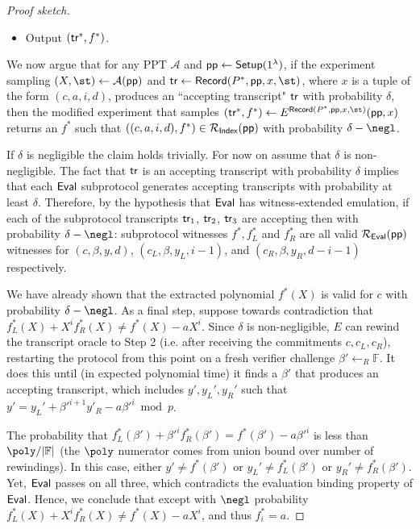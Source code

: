 \begin{proof}[Proof sketch]
\begin{itemize}
\item Output $(\textsf{{tr}}^*, f^*)$.  
\end{itemize}

We now argue that for any PPT $\mathcal{A}$ and $\textsf{pp} \leftarrow \textsf{{Setup}}(1^\lambda)$, if the experiment sampling $(X, \st) \leftarrow \mathcal{A}(\params)$ and $\tr \leftarrow \pro{Record}(P^*, \params, x, \st)$, where $x$ is a tuple of the form $(c, a, i, d)$, produces an ``accepting transcript" $\textsf{{tr}}$ with probability $\delta$, then the modified experiment that samples $(\tr^*, f^*) \leftarrow E^{\textsf{Record}(P^*, \params, x, \st)}(\params, x)$ returns an $f^*$ such that $((c, a, i, d), f^*) \in \mathcal{R_\textsf{Index}}(\textsf{pp})$ with probability $\delta - \negl$. 

If $\delta$ is negligible the claim holds trivially. For now on assume that $\delta$ is non-negligible. 
The fact that $\textsf{{tr}}$ is an accepting transcript with probability $\delta$ implies that each $\textsf{{Eval}}$ subprotocol generates accepting transcripts with probability at least $\delta$. Therefore, by the hypothesis that $\textsf{{Eval}}$ has witness-extended emulation, if each of the subprotocol transcripts $\textsf{{tr}}_1$, $\textsf{{tr}}_2$, $\textsf{{tr}}_3$ are accepting then with probability $\delta - \negl$: subprotocol witnesses $f^*, f_L^*$ and $f_R^*$ are all valid $\mathcal{R_\textsf{Eval}}(\textsf{pp})$ witnesses for $(c, \beta, y, d)$, $(c_L, \beta, y_L, i-1)$, and $(c_R, \beta, y_R, d - i - 1)$ respectively. 

We have already shown that the extracted polynomial $f^*(X)$ is valid for $c$ with probability $\delta - \negl$. As a final step, suppose towards contradiction that $f_L^*(X) + X^i f_R^*(X) \neq f^*(X) - a X^i$. Since $\delta$ is non-negligible, $E$ can rewind the transcript oracle to Step 2 (i.e. after receiving the commitments $c, c_L, c_R$), restarting the protocol from this point on a fresh verifier challenge $\beta' \leftarrow_R \mathbb{F}$. It does this until (in expected polynomial time) it finds a $\beta'$ that produces an accepting transcript, which includes $y', y_L', y_R'$ such that $y' = y_L' + \beta'^{i+1} y'_R - a \beta'^i \bmod p$.

The probability that $f_L^*(\beta') + \beta'^i f_R^*(\beta') = f^*(\beta') - a \beta'^i$ is less than $\poly / |\mathbb{F}|$ (the $\poly$ numerator comes from union bound over number of rewindings). In this case, either $y' \neq f^*(\beta')$ or $y_L' \neq f^*_L(\beta')$ or $y_R' \neq f^*_R(\beta')$. Yet, $\textsf{{Eval}}$ passes on all three, which contradicts the evaluation binding property of $\textsf{{Eval}}$. Hence, we conclude that except with $\negl$ probability $f_L^*(X) + X^i f_R^*(X) \neq f^*(X) - a X^i$, and thus $f^*_i = a$. 

\end{proof}


